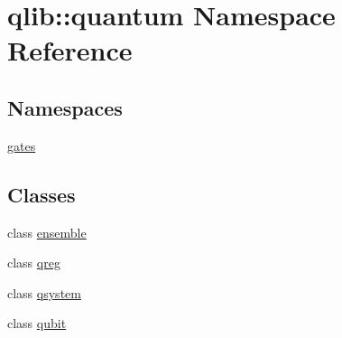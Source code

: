 \hypertarget{namespaceqlib_1_1quantum}{}\section{qlib\+:\+:quantum Namespace Reference}
\label{namespaceqlib_1_1quantum}
\subsection*{Namespaces}
\begin{DoxyCompactItemize}
\item 
 \hyperlink{namespaceqlib_1_1quantum_1_1gates}{gates}
\end{DoxyCompactItemize}
\subsection*{Classes}
\begin{DoxyCompactItemize}
\item 
class \hyperlink{classqlib_1_1quantum_1_1ensemble}{ensemble}
\item 
class \hyperlink{classqlib_1_1quantum_1_1qreg}{qreg}
\item 
class \hyperlink{classqlib_1_1quantum_1_1qsystem}{qsystem}
\item 
class \hyperlink{classqlib_1_1quantum_1_1qubit}{qubit}
\end{DoxyCompactItemize}
